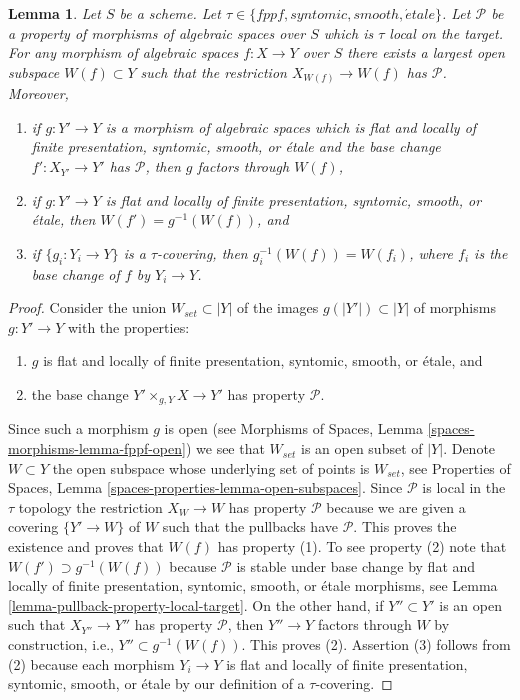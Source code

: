 \documentclass{stacks-project}
\theoremstyle{plain}
\newtheorem{lemma}[subsection]{Lemma}
\theoremstyle{definition}
\theoremstyle{remark}
\numberwithin{equation}{subsection}
\def\etale{{\acute{e}tale}}
\begin{document}
\begin{lemma}
\label{lemma-largest-open-of-the-base}
Let $S$ be a scheme.
Let $\tau \in \{fppf, syntomic, smooth, \etale\}$.
Let $\mathcal{P}$ be a property of morphisms of algebraic spaces over $S$
which is $\tau$ local on the target. For any morphism of algebraic spaces
$f : X \to Y$ over $S$ there exists a largest open subspace
$W(f) \subset Y$ such that the restriction $X_{W(f)} \to W(f)$ has
$\mathcal{P}$. Moreover,
\begin{enumerate}
\item if $g : Y' \to Y$ is a morphism of algebraic spaces which is
flat and locally of finite presentation, syntomic, smooth, or \'etale
and the base change $f' : X_{Y'} \to Y'$ has $\mathcal{P}$, then
$g$ factors through $W(f)$,
\item if $g : Y' \to Y$ is flat and locally of finite presentation,
syntomic, smooth, or \'etale, then $W(f') = g^{-1}(W(f))$, and
\item if $\{g_i : Y_i \to Y\}$ is a $\tau$-covering, then
$g_i^{-1}(W(f)) = W(f_i)$, where $f_i$ is the base change of $f$
by $Y_i \to Y$.
\end{enumerate}
\end{lemma}

\begin{proof}
Consider the union $W_{set} \subset |Y|$ of the images
$g(|Y'|) \subset |Y|$ of morphisms $g : Y' \to Y$ with the properties:
\begin{enumerate}
\item $g$ is flat and locally of finite presentation, syntomic,
smooth, or \'etale, and
\item the base change $Y' \times_{g, Y} X \to Y'$ has property
$\mathcal{P}$.
\end{enumerate}
Since such a morphism $g$ is open (see
Morphisms of Spaces, Lemma \ref{spaces-morphisms-lemma-fppf-open})
we see that $W_{set}$ is an open subset of $|Y|$. Denote $W \subset Y$
the open subspace whose underlying set of points is $W_{set}$, see
Properties of Spaces, Lemma \ref{spaces-properties-lemma-open-subspaces}.
Since $\mathcal{P}$ is local in the $\tau$ topology the restriction
$X_W \to W$ has property $\mathcal{P}$ because we are given a covering
$\{Y' \to W\}$ of $W$ such that the pullbacks have $\mathcal{P}$.
This proves the existence and proves that $W(f)$ has property (1).
To see property (2) note that $W(f') \supset g^{-1}(W(f))$ because
$\mathcal{P}$ is stable under base change by flat and locally of finite
presentation, syntomic, smooth, or \'etale morphisms, see
Lemma \ref{lemma-pullback-property-local-target}.
On the other hand, if $Y'' \subset Y'$ is an open such that
$X_{Y''} \to Y''$ has property $\mathcal{P}$, then $Y'' \to Y$ factors
through $W$ by construction, i.e., $Y'' \subset g^{-1}(W(f))$. This
proves (2). Assertion (3) follows from (2) because each morphism
$Y_i \to Y$ is flat and locally of finite presentation, syntomic,
smooth, or \'etale by our definition of a $\tau$-covering.
\end{proof}
\end{document}
